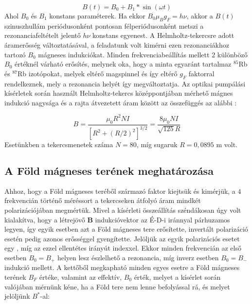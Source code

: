\begin{multicols}{2}
\begin{equation}
B \left( t \right)
=
B_{0} + B_{1} * \sin \left( \omega t \right)
\end{equation}
Ahol $B_{0}$ és $B_{1}$ konstans paraméterek. Ha ekkor $B_{0} \mu_{B} g_{F} = h \nu$, akkor a $B \left( t \right)$ szinuszhullám periódusonként pontosan félperiódusonként metszi a rezonanciafeltételt jelentő $h \nu$ konstans egyenest. A Helmholtz-tekercsre adott áramerősség változtatásával, a feladatunk volt kimérni ezen rezonanciákhoz tartozó $B_{0}$ mágneses indukciókat. Minden frekvenciabeállítás mellett $2$ különböző $B_{0}$ értéknél várható erősítés, melynek oka, hogy a minta egyaránt tartalmaz $^{85}$Rb és $^{87}$Rb izotópokat, melyek eltérő magspinnel és így eltérő $g_{F}$ faktorral rendelkeznek, mely a rezonancia helyét így megváltoztatja. Az optikai pumpálási kísérletek során használt Helmholtz-tekercs középpontjában mérhető mágnes indukció nagysága és a rajta átvezetett áram között az összefüggés az alábbi \citep{MIT_OPU}:

\begin{equation} \label{eq:5}
B
=
\frac{\mu_{0} R^{2} N I}{\left[R^{2} + \left( R/2 \right)^{2} \right]^{3/2}}
=
\frac{8 \mu_{0} N I}{\sqrt{125} R}
\end{equation}
Esetünkben a tekercsmenetek száma $N = 80$, míg sugaruk $R = 0,0895$ m volt.

\subsection{A Föld mágneses terének meghatározása}
Ahhoz, hogy a Föld mágneses teréből származó faktor kiejtsük és kimérjük, a $4$ frekvencián történő méréssort a tekercseken átfolyó áram mindkét polarizációjában megmértük. Mivel a kísérleti összeállítás széndákosan úgy volt kialakítva, hogy a létrejövő $\boldsymbol{B}$ indukcióvektor az É-D-i iránnyal párhuzamos legyen, így egyik esetben azt a Föld mágneses tere erősítette, invertált polarizáció esetén pedig azonos erősséggel gyengítette. Jelöljük az egyik polarizációs esetet egy \q{$+$}, míg az ezzel ellentétes irányút \q{$-$} indexxel. Ekkor minden frekvencián az első esetben $B_{0} = B_{+}$ helyen lesz észlelhető a rezonancia, míg inverz esetben $B_{0} = B_{-}$ indukció mellett. A kettőből megkapható minden egyes esetre a Föld mágneses terének $B_{F}$ értéke, valamint az effektív,  $B_{0}$ érték, melyet a kísérlet során valójában mérnünk kéne, ha a Föld tere nem lenne befolyással rá, és melyet jelöljünk $B^{\ast}$-al:


\end{multicols}
